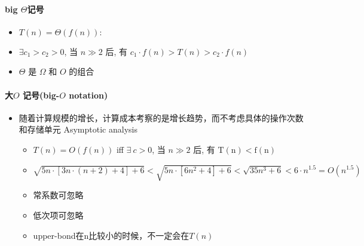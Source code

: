 \paragraph{big $\Theta$记号}
\begin{itemize}
\item $T(n)=\Theta(f(n)):$
\item $\exists c_{1}>c_{2}>0$, 当 $n \gg 2$ 后, 有 $c_{1} \cdot f(n)>T(n)>c_{2} \cdot f(n)$
\item $\Theta$ 是 $\Omega$ 和 $O$ 的组合
\end{itemize}

\paragraph{大$O$ 记号(big-$O$ notation)}
\begin{itemize}
\item 随着计算规模的增长，计算成本考察的是增长趋势，而不考虑具体的操作次数和存储单元 \ra Asymptotic analysis
\begin{itemize}
\item $T(n)=O(f(n))$ iff $\exists\ c>0$, 当 $n \gg 2$ 后, 有 $\mathrm{T}(\mathrm{n})< \mathrm{f}(\mathrm{n})$
\item $\sqrt{5 n \cdot[3 n \cdot(n+2)+4]+6}< \sqrt{5 n \cdot\left[6 n^{2}+4\right]+6}<\sqrt{35 n^{3}+6}<6 \cdot n^{1.5}=O\left(n^{1.5}\right)$
\item 常系数可忽略
\item 低次项可忽略
\item upper-bond在n比较小的时候，不一定会在$T(n)$
\end{itemize}
\end{itemize}


